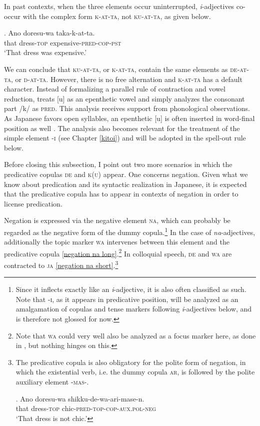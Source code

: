 \documentclass [output=book,colorlinks,citecolor=brown]{langscibook}
\begin{document}
In past contexts, when the three elements occur uninterrupted, \textit{i}-adjectives co-occur with the complex form \textsc{k-at-ta}, not \textsc{ku-at-ta}, as given below.

\exg. Ano doresu-wa taka-k-at-ta.\\
that dress-\textsc{top} expensive-\textsc{pred-cop-pst}\\
`That dress was expensive.'

We can conclude that \textsc{ku-at-ta}, or \textsc{k-at-ta}, contain the same elements as \textsc{de-at-ta}, or \textsc{d-at-ta}. However, there is no free alternation and \textsc{k-at-ta} has a default character. Instead of formalizing a parallel rule of contraction and vowel reduction, \citet[192–193]{nishiyama:1999:adj} treats [u] as an epenthetic vowel and simply analyzes the consonant part /k/ as \textsc{pred}. This analysis receives support from phonological observations. As Japanese favors open syllables, an epenthetic [u] is often inserted in word-final position as well \citep{kubozono:2005:rendaku, ito:2015:word}. The analysis also becomes relevant for the treatment of the simple element -\textsc{i} (see Chapter \ref{kitoi}) and will be adopted in the spell-out rule below. %

Before closing this subsection, I point out two more scenarios in which the predicative copulas \textsc{de} and \textsc{k(u)} appear. One concerns negation. Given what we know about predication and its syntactic realization in Japanese, it is expected that the predicative copula has to appear in contexts of negation in order to license predication.

Negation is expressed via the negative element \textsc{na}, which can probably be regarded as the negative form of the dummy copula.\footnote{Since it inflects exactly like an \textit{i}-adjective, it is also often classified as such. Note that -\textsc{i}, as it appears in predicative position, will be analyzed as an amalgamation of copulas and tense markers following \textit{i}-adjectives below, and is therefore not glossed for now.} In the case of \textit{na}-adjectives, additionally the topic marker \textsc{wa} intervenes between this element and the predicative copula  \ref{negation na long}.\footnote{Note that \textsc{wa} could very well also be analyzed as a focus marker here, as done in \citet[6]{yamada:2023:looking}, but nothing hinges on this.} In colloquial speech, \textsc{de} and \textsc{wa} are contracted to \textsc{ja} \ref{negation na short}.\footnote{The predicative copula is also obligatory for the polite form of negation, in which the existential verb, i.e. the dummy copula \textsc{ar}, is followed by the polite auxiliary element -\textsc{mas}-. %

\par

\exg. Ano doresu-wa shikku-de-wa-ari-mase-n.\\
that dress-\textsc{top} chic-\textsc{pred-top-cop-aux.pol-neg}\\
`That dress is not chic.'

\par

}
\end{document}
